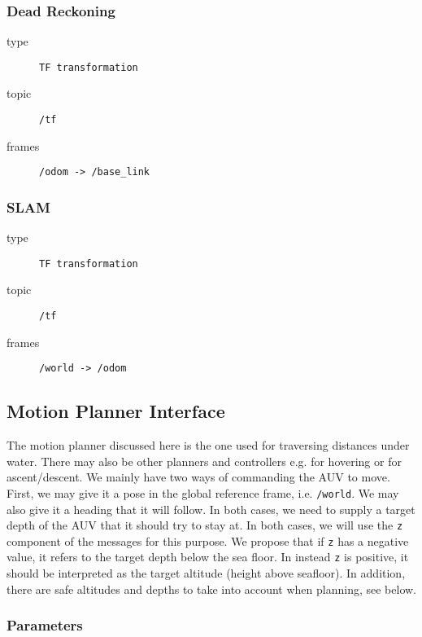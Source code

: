 \documentclass[9pt,technote]{IEEEtran} %
\begin{document}
\subsubsection{Dead Reckoning}
\label{dr}

\begin{description}
\item[type] \texttt{TF transformation}
\item[topic] \texttt{/tf}
\item[frames] \texttt{/odom -> /base\_link}
\end{description}

\subsubsection{SLAM}
\label{mapping}

\begin{description}
\item[type] \texttt{TF transformation}
\item[topic] \texttt{/tf}
\item[frames] \texttt{/world -> /odom}
\end{description}

\subsection{Motion Planner Interface}
\label{planner}

The motion planner discussed here is the one used for
traversing distances under water. There may also be
other planners and controllers e.g. for hovering or
for ascent/descent. We mainly have two ways of commanding
the AUV to move. First, we may give it a pose in
the global reference frame, i.e. \texttt{/world}.
We may also give it a heading that it will follow.
In both cases, we need to supply a target depth of
the AUV that it should try to stay at. In both cases,
we will use the \texttt{z} component of the messages
for this purpose. We propose that if \texttt{z} has a
negative value, it refers to the target depth below
the sea floor. In instead \texttt{z} is positive, it
should be interpreted as the target altitude (height above seafloor).
In addition, there are safe altitudes and depths to take
into account when planning, see below.

\subsubsection{Parameters}
\end{document}
